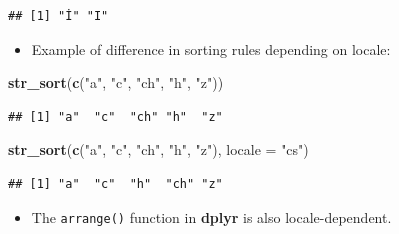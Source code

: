 \documentclass[
]{article}
\newenvironment{Shaded}{\begin{snugshade}}{\end{snugshade}}
\newcommand{\AttributeTok}[1]{\textcolor[rgb]{0.13,0.29,0.53}{#1}}
\newcommand{\FunctionTok}[1]{\textcolor[rgb]{0.13,0.29,0.53}{\textbf{#1}}}
\newcommand{\NormalTok}[1]{#1}
\newcommand{\StringTok}[1]{\textcolor[rgb]{0.31,0.60,0.02}{#1}}
\providecommand{\tightlist}{%
  \setlength{\itemsep}{0pt}\setlength{\parskip}{0pt}}
\begin{document}
\begin{verbatim}
## [1] "İ" "I"
\end{verbatim}

\begin{itemize}
\tightlist
\item
  Example of difference in sorting rules depending on locale:
\end{itemize}

\begin{Shaded}
\begin{Highlighting}[]
\FunctionTok{str\_sort}\NormalTok{(}\FunctionTok{c}\NormalTok{(}\StringTok{"a"}\NormalTok{, }\StringTok{"c"}\NormalTok{, }\StringTok{"ch"}\NormalTok{, }\StringTok{"h"}\NormalTok{, }\StringTok{"z"}\NormalTok{))}
\end{Highlighting}
\end{Shaded}

\begin{verbatim}
## [1] "a"  "c"  "ch" "h"  "z"
\end{verbatim}

\begin{Shaded}
\begin{Highlighting}[]
\FunctionTok{str\_sort}\NormalTok{(}\FunctionTok{c}\NormalTok{(}\StringTok{"a"}\NormalTok{, }\StringTok{"c"}\NormalTok{, }\StringTok{"ch"}\NormalTok{, }\StringTok{"h"}\NormalTok{, }\StringTok{"z"}\NormalTok{), }\AttributeTok{locale =} \StringTok{"cs"}\NormalTok{)}
\end{Highlighting}
\end{Shaded}

\begin{verbatim}
## [1] "a"  "c"  "h"  "ch" "z"
\end{verbatim}

\begin{itemize}
\tightlist
\item
  The \texttt{arrange()} function in \textbf{dplyr} is also
  locale-dependent.
\end{itemize}
\end{document}
